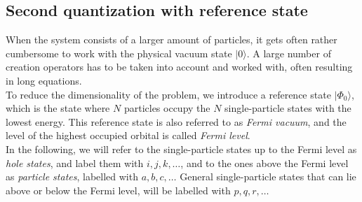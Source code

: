 \subsection{Second quantization with reference state}
\label{subsec:SecQuantRef}
When the system consists of a larger amount of particles, it gets often rather cumbersome to work with the physical vacuum state $|0\rangle$. A large number of creation operators has to be taken into account and worked with, often resulting in long equations. \\
To reduce the dimensionality of the problem, we introduce a reference state $|\Phi_0\rangle$, which is the state where $N$ particles occupy the $N$ single-particle states with the lowest energy. This reference state is also referred to as \textit{Fermi vacuum}, and the level of the highest occupied orbital is called \textit{Fermi level}.\\
In the following, we will refer to the single-particle states up to the Fermi level as \textit{hole states}, and label them with $i,j,k,\dots$, and to the ones above the Fermi level as \textit{particle states}, labelled with $a,b,c,\dots$ General single-particle states that can lie above or below the Fermi level, will be labelled with $p,q,r,\dots$

